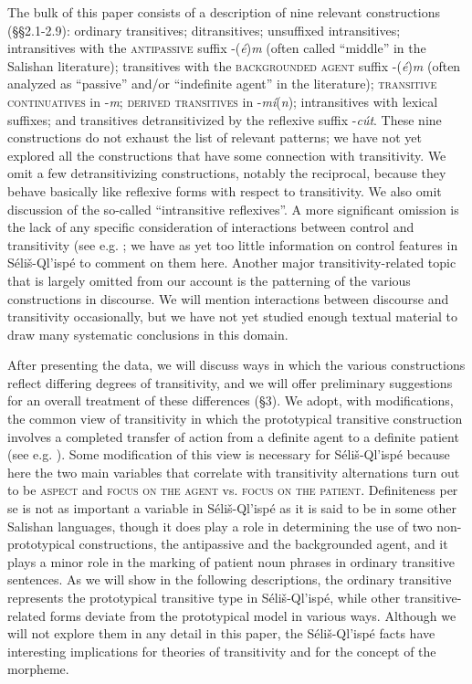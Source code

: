 \documentclass[output=paper,colorlinks,citecolor=brown]{langscibook}
\begin{document}
  The bulk of this paper consists of a description of nine relevant
  constructions (\S\S 2.1-2.9): ordinary transitives; ditransitives;
  unsuffixed intransitives; intransitives with the
  \textsc{antipassive} suffix -(\emph{\'e})\emph{m} (often called
  ``middle'' in the Salishan literature); transitives with the
  \textsc{backgrounded agent} suffix -(\emph{\'e})\emph{m} (often
  analyzed as ``passive'' and/or ``indefinite agent'' in the
  literature); \textsc{transitive continuatives} in -\emph{m};
  \textsc{derived transitives} in -\emph{m\'i}(\emph{n});
  intransitives with lexical suffixes; and transitives
  detransitivized by the reflexive suffix -\emph{c\'ut}.  These nine
  constructions do not exhaust the list of relevant patterns; we have
  not yet explored all the constructions that have some connection
  with transitivity.  We omit a few detransitivizing constructions,
  notably the reciprocal, because they behave basically like
  reflexive forms with respect to transitivity.  We also omit
  discussion of the so-called ``intransitive reflexives''.  A more
  significant omission is the lack of any specific consideration of
  interactions between control and transitivity (see
  e.g. \cite{Thompson:1985}; we have as yet too little information
  on control features in S\'eli\v{s}-Ql'isp\'e to comment on them
  here.  Another major transitivity-related topic that is largely
  omitted from our account is the patterning of the various
  constructions in discourse.  We will mention interactions between
  discourse and transitivity occasionally, but we have not yet
  studied enough textual material to draw many systematic conclusions
  in this domain.


  After presenting the data, we will discuss ways in which the
  various constructions reflect differing degrees of transitivity,
  and we will offer preliminary suggestions for an overall treatment
  of these differences (\S 3).  We adopt, with modifications, the
  common view of transitivity in which the prototypical transitive
  construction involves a completed transfer of action from a
  definite agent to a definite patient (see
  e.g. \cite{Hopper&Thompson:1980}).  Some modification of this view is
  necessary for
  S\'eli\v{s}-Ql'isp\'e because here the two main variables that
  correlate with transitivity alternations turn out to be \textsc{     aspect} and \textsc{focus on the agent} vs. \textsc{focus on the
    patient}.  Definiteness per se is not as important a variable in
  S\'eli\v{s}-Ql'isp\'e as it is said to be in some other Salishan
  languages, though it does play a role in determining the use of two
  non-prototypical constructions, the antipassive and the
  backgrounded agent, and it plays a minor role in the marking of
  patient noun phrases in ordinary transitive sentences.  As we will
  show in the following descriptions, the ordinary transitive
  represents the prototypical transitive type in
  S\'eli\v{s}-Ql'isp\'e, while other transitive-related forms deviate
  from the prototypical model in various ways.  Although we will not
  explore them in any detail in this paper, the S\'eli\v{s}-Ql'isp\'e
  facts have interesting implications for theories of transitivity
  and for the concept of the morpheme.
\end{document}
